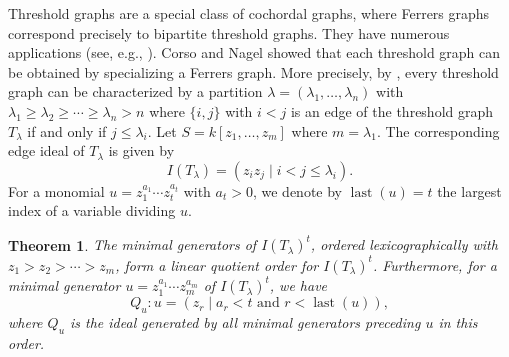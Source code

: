 \documentclass[12pt,amscd]{amsart}
\newtheorem{thm}{Theorem}[section]
\theoremstyle{definition}
\numberwithin{equation}{section}
\begin{document}
Threshold graphs are a special class of cochordal graphs, where Ferrers graphs correspond precisely to bipartite threshold graphs. They have numerous applications (see, e.g., \cite{MP}). Corso and Nagel \cite{CN2} showed that each threshold graph can be obtained by specializing a Ferrers graph. More precisely, by \cite[Corollary 4.6]{CN2}, every threshold graph can be characterized by a partition $\lambda = (\lambda_1, \ldots, \lambda_n)$ with $\lambda_1 \ge \lambda_2 \ge \cdots \ge \lambda_n > n$ where $\{i,j\}$ with $i < j$ is an edge of the threshold graph $T_\lambda$ if and only if $j \le \lambda_i$. Let $S = k[z_1, \ldots, z_m]$ where $m = \lambda_1$. The corresponding edge ideal of $T_\lambda$ is given by 
\[
I(T_\lambda) = (z_i z_j \mid i < j \le \lambda_i).
\]
For a monomial $u = z_1^{a_1} \cdots z_t^{a_t}$ with $a_t > 0$, we denote by $\operatorname{last}(u) = t$ the largest index of a variable dividing $u$.

\begin{thm}\label{thm_linear_quotient_threshold} 
The minimal generators of $I(T_\lambda)^t$, ordered lexicographically with $z_1 > z_2 > \cdots > z_m$, form a linear quotient order for $I(T_\lambda)^t$. Furthermore, for a minimal generator $u = z_1^{a_1} \cdots z_m^{a_m}$ of $I(T_\lambda)^t$, we have 
\[
Q_u : u = (z_r \mid a_r < t \text{ and } r < \operatorname{last}(u)),
\]
where $Q_u$ is the ideal generated by all minimal generators preceding $u$ in this order.
\end{thm}
\end{document}
